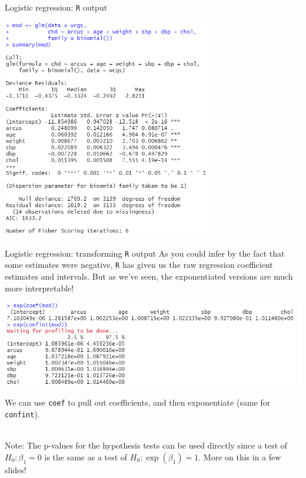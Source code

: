 \documentclass[10pt,t]{beamer}
\begin{document}
\begin{frame}{Logistic regression: \texttt{R} output}
	\vspace{-1cm}
		\begin{center}
		\includegraphics[width=0.7\textwidth]{./figs/multiple_logistic_regression_arcus}
	\end{center}
\end{frame}

\begin{frame}{Logistic regression: transforming \texttt{R} output}
	\vspace{-0.7cm}
	As you could infer by the fact that some estimates were negative, \texttt{R} has given us the raw regression coefficient estimates and intervals. But as we've seen, the exponentiated versions are much more interpretable!
			\begin{center}
		\includegraphics[width=\textwidth]{./figs/multiple_logistic_regression_arcus_exp}
	\end{center}
	We can use \texttt{coef} to pull out coefficients, and then exponentiate (same for \texttt{confint}).
	\\ ~\
	
	Note: The p-values for the hypothesis tests can be used directly since a test of $H_0: \beta_1 = 0$ is the same as a test of $H_0: \exp(\beta_1) = 1$. More on this in a few slides!
\end{frame}
\end{document}

